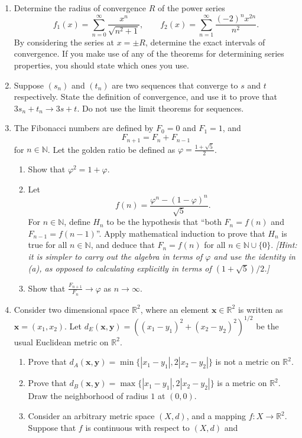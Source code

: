 \documentclass[12pt]{article}
\newcommand{\N}{\mathbb{N}}
\newcommand{\R}{\mathbb{R}}
\renewcommand{\vec}[1]{\mathbf{#1}}
\begin{document}
\begin{enumerate}
  \item Determine the radius of convergence $R$ of the power series
    \[
    f_1(x)=\sum_{n=0}^\infty \frac{x^n}{\sqrt{n^2+1}}, \qquad f_2(x)=\sum_{n=1}^\infty \frac{(-2)^n x^{2n}}{n^2}.
    \]
    By considering the series at $x=\pm R$, determine the exact intervals of
    convergence. If you make use of any of the theorems for determining series
    properties, you should state which ones you use.
  \item Suppose $(s_n)$ and $(t_n)$ are two sequences that converge to $s$ and
    $t$ respectively. State the definition of convergence, and use it to prove
    that $3s_n+t_n \to 3s+t$. Do not use the limit theorems for
    sequences.
  \item The Fibonacci numbers are defined by $F_0=0$ and $F_1=1$,
    and
    \[
    F_{n+1} = F_n+F_{n-1}
    \]
    for $n\in \N$. Let the golden ratio be defined as
    $\varphi=\frac{1+\sqrt{5}}{2}$.
    \begin{enumerate}
      \item Show that $\varphi^2=1+\varphi$.
      \item Let
	\[
	f(n)=\frac{\varphi^n-(1-\varphi)^n}{\sqrt{5}}.
	\]
	For $n\in \N$, define $H_n$ to be the hypothesis that ``both
	$F_n=f(n)$ and $F_{n-1}=f(n-1)$''. Apply mathematical induction to
	prove that $H_n$ is true for all $n \in \N$, and deduce that
	$F_n=f(n)$ for all $n \in \N \cup \{0\}$.
	{\it [Hint: it is simpler to carry out the algebra in terms of
	$\varphi$ and use the identity in (a), as opposed to calculating
	explicitly in terms of $(1+\sqrt{5})/2$.]}
      \item Show that $\frac{F_{n+1}}{F_n} \to \varphi$
	as $n \to \infty$.
    \end{enumerate}
  \item Consider two dimensional space $\R^2$, where an element $\vec{x} \in
    \R^2$ is written as $\vec{x}=(x_1,x_2)$. Let $d_E(\vec{x},\vec{y})=(
    (x_1-y_1)^2+(x_2-y_2)^2 )^{1/2}$ be the usual Euclidean metric on $\R^2$.
    \begin{enumerate}
      \item Prove that $d_A(\vec{x},\vec{y}) = \min\{|x_1-y_1|,2|x_2-y_2|\}$ is
	not a metric on $\R^2$.
      \item Prove that $d_B(\vec{x},\vec{y}) = \max\{|x_1-y_1|,2|x_2-y_2|\}$ is
	a metric on $\R^2$. Draw the neighborhood of radius $1$ at $(0,0)$.
      \item Consider an arbitrary metric space $(X,d)$, and a mapping $f: X \to
	\R^2$. Suppose that $f$ is continuous with respect to $(X,d)$ and

\end{enumerate}
\end{enumerate}
\end{document}
